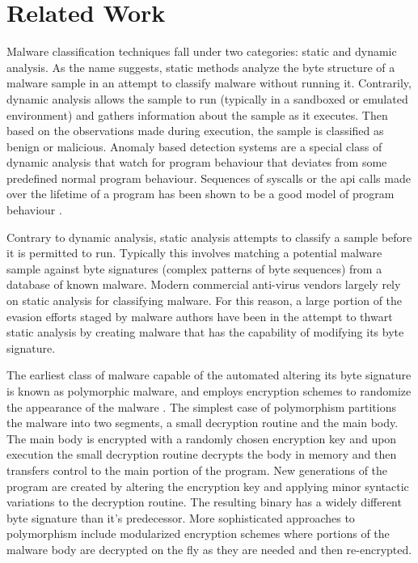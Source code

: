 \chapter{Related Work}

    Malware classification techniques fall under two categories: static and
    dynamic analysis. As the name suggests, static methods analyze the byte
    structure of a malware sample in an attempt to classify malware without
    running it. Contrarily, dynamic analysis allows the sample to run (typically
    in a sandboxed or emulated environment) and gathers information about the
    sample as it executes. Then based on the observations made during execution,
    the sample is classified as benign or malicious.  Anomaly based detection
    systems are a special class of dynamic analysis that watch for program
    behaviour that deviates from some predefined normal program behaviour.
    Sequences of syscalls or the api calls made over the lifetime of a program
    has been shown to be a good model of program behaviour \cite{api_calls}.

    Contrary to dynamic analysis, static analysis attempts to classify a sample
    before it is permitted to run. Typically this involves matching a potential
    malware sample against byte signatures (complex patterns of byte sequences)
    from a database of known malware.  Modern commercial anti-virus vendors
    largely rely on static analysis for classifying malware. For this reason, a
    large portion of the evasion efforts staged by malware authors have been in
    the attempt to thwart static analysis by creating malware that has the
    capability of modifying its byte signature.

    The earliest class of malware capable of the automated altering its byte
    signature is known as polymorphic malware, and employs encryption schemes to
    randomize the appearance of the malware \cite{simile}.  The simplest case of
    polymorphism partitions the malware into two segments, a small decryption
    routine and the main body. The main body is encrypted with a randomly chosen
    encryption key and upon execution the small decryption routine decrypts the
    body in memory and then transfers control to the main portion of the
    program.  New generations of the program are created by altering the
    encryption key and applying minor syntactic variations to the decryption
    routine. The resulting binary has a widely different byte signature than
    it's predecessor.  More sophisticated approaches to polymorphism include
    modularized encryption schemes where portions of the malware body are
    decrypted on the fly as they are needed and then re-encrypted.

